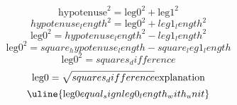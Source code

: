 \[\text{{{hypotenuse}}}^{{2}}=\text{{{leg0}}}^{{2}}+\text{{{leg1}}}^{{2}}\]
\[{hypotenuse_length}^{{2}}=\text{{{leg0}}}^{{2}}+{leg1_length}^{{2}}\]
\[\text{{{leg0}}}^{{2}}={hypotenuse_length}^{{2}}-{leg1_length}^{{2}}\]
\[\text{{{leg0}}}^{{2}}={square_hypotenuse_length}-{square_leg1_length}\]
\[\text{{{leg0}}}^{{2}}={squares_difference}\]
\[\text{{{leg0}}}=\sqrt{{\mathstrut {squares_difference}}}\text{{{explanation}}}\]
\[\uline{{\text{{{leg0}}}{equal_sign}{leg0_length_with_unit}}}\]